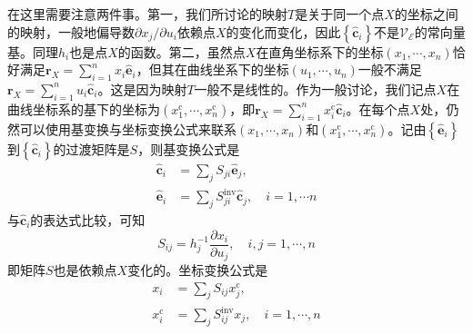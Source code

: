 \documentclass[../main.tex]{subfiles}
\begin{document}
在这里需要注意两件事。第一，我们所讨论的映射$T$是关于同一个点$X$的坐标之间的映射，一般地偏导数$\partial x_j/\partial u_i$依赖点$X$的变化而变化，因此$\left\{\mathbf{\hat{c}}_i\right\}$不是$\mathcal{V}_\mathcal{E}$的常向量基。同理$h_i$也是点$X$的函数。第二，虽然点$X$在直角坐标系下的坐标$\left(x_1,\cdots,x_n\right)$恰好满足$\mathbf{r}_X=\sum_{i=1}^nx_i\mathbf{\hat{e}}_i$，但其在曲线坐系下的坐标$\left(u_1,\cdots,u_n\right)$一般不满足$\mathbf{r}_X=\sum_{i=1}^nu_i\mathbf{\hat{c}}_i$。这是因为映射$T$一般不是线性的。作为一般讨论，我们记点$X$在曲线坐标系的基下的坐标为$\left(x_1^\mathrm{c},\cdots,x_n^\mathrm{c}\right)$，即$\mathbf{r}_X=\sum_{i=1}^nx_i^\mathrm{c}\mathbf{\hat{c}}_i$。在每个点$X$处，仍然可以使用基变换与坐标变换公式来联系$\left(x_1,\cdots,x_n\right)$和$\left(x_1^\mathrm{c},\cdots,x_n^\mathrm{c}\right)$。记由$\left\{\mathbf{\hat{e}}_i\right\}$到$\left\{\mathbf{\hat{c}}_i\right\}$的过渡矩阵是$S$，则基变换公式是
\[
    \begin{aligned}
        \mathbf{\hat{c}}_i & =\sum_{j}S_{ji}\mathbf{\hat{e}}_j,                               \\
        \mathbf{\hat{e}}_i & =\sum_j S_{ji}^\mathrm{inv}\mathbf{\hat{c}}_j,\quad i=1,\cdots n
    \end{aligned}
\]
与$\mathbf{\hat{c}}_i$的表达式比较，可知
\[S_{ij}=h_j^{-1}\frac{\partial x_i}{\partial u_j},\quad i,j=1,\cdots,n\]
即矩阵$S$也是依赖点$X$变化的。坐标变换公式是
\[
    \begin{aligned}
        x_i            & =\sum_j S_{ij}x_j^\mathrm{c},                    \\
        x_i^\mathrm{c} & =\sum_jS_{ij}^\mathrm{inv}x_j,\quad i=1,\cdots,n
    \end{aligned}
\]
\end{document}
